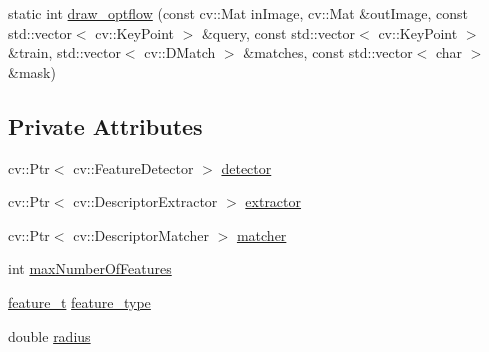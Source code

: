 \begin{DoxyCompactItemize}
\item 
static int \hyperlink{classLRM_1_1ImageProcessor_a23b4e5f58559a566cf15b204acf0aa22}{draw\-\_\-optflow} (const cv\-::\-Mat in\-Image, cv\-::\-Mat \&out\-Image, const std\-::vector$<$ cv\-::\-Key\-Point $>$ \&query, const std\-::vector$<$ cv\-::\-Key\-Point $>$ \&train, std\-::vector$<$ cv\-::\-D\-Match $>$ \&matches, const std\-::vector$<$ char $>$ \&mask)
\end{DoxyCompactItemize}
\subsection*{\-Private \-Attributes}
\begin{DoxyCompactItemize}
\item 
cv\-::\-Ptr$<$ cv\-::\-Feature\-Detector $>$ \hyperlink{classLRM_1_1ImageProcessor_a576a9af86d68d4394984e630c7ec452d}{detector}
\item 
cv\-::\-Ptr$<$ cv\-::\-Descriptor\-Extractor $>$ \hyperlink{classLRM_1_1ImageProcessor_a7a52a914f184c8b01fe42d582fc17af0}{extractor}
\item 
cv\-::\-Ptr$<$ cv\-::\-Descriptor\-Matcher $>$ \hyperlink{classLRM_1_1ImageProcessor_a55350c39b33c45697fcf48ff75bef2d1}{matcher}
\item 
int \hyperlink{classLRM_1_1ImageProcessor_afcdba0a2c3377e8d89d8abb42632bf3a}{max\-Number\-Of\-Features}
\item 
\hyperlink{namespaceLRM_a8eb6956b84fb7d27bce5af771937794f}{feature\-\_\-t} \hyperlink{classLRM_1_1ImageProcessor_abdfb33d345e6e7eebff614252e27095b}{feature\-\_\-type}
\item 
double \hyperlink{classLRM_1_1ImageProcessor_a46e10168106b028e29042dbe8e13f83e}{radius}
\end{DoxyCompactItemize}


